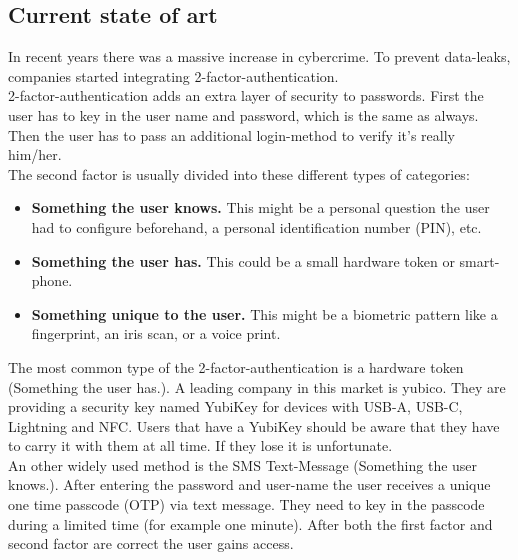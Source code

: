 \documentclass[conference]{IEEEtran}
\begin{document}
\subsection{Current state of art}
In recent years there was a massive increase in cybercrime. To prevent data-leaks, companies started integrating 2-factor-authentication.\cite{b4}\\
2-factor-authentication adds an extra layer of security to passwords. First the user has to key in the user name and password, which is the same as always. Then the user has to pass an additional login-method to verify it's really him/her.\\
The second factor is usually divided into these different types of categories:
\begin{itemize}
\item \textbf{Something the user knows.}  This might be a personal question the user had to configure beforehand, a personal identification number (PIN), etc.
\item \textbf{Something the user has.} This could be a small hardware token or smart-phone.
\item \textbf{Something unique to the user.} This might be a  biometric pattern like a fingerprint, an iris scan, or a voice print. 
\end{itemize}
The most common type of the 2-factor-authentication is a hardware token (Something the user has.). A leading company in this market is yubico. They are providing a security key named YubiKey for devices with USB-A, USB-C, Lightning and NFC. Users that have a YubiKey should be aware that they have to carry it with them at all time. If they lose it is unfortunate.\cite{11}\\
An other widely used method is the SMS Text-Message (Something the user knows.). After entering the password and user-name the user receives a unique one time passcode (OTP) via text message. They need to key in the passcode during a limited time (for example one minute). After both the first factor and second factor are correct the user gains access.

                                                                                               
\end{document}
